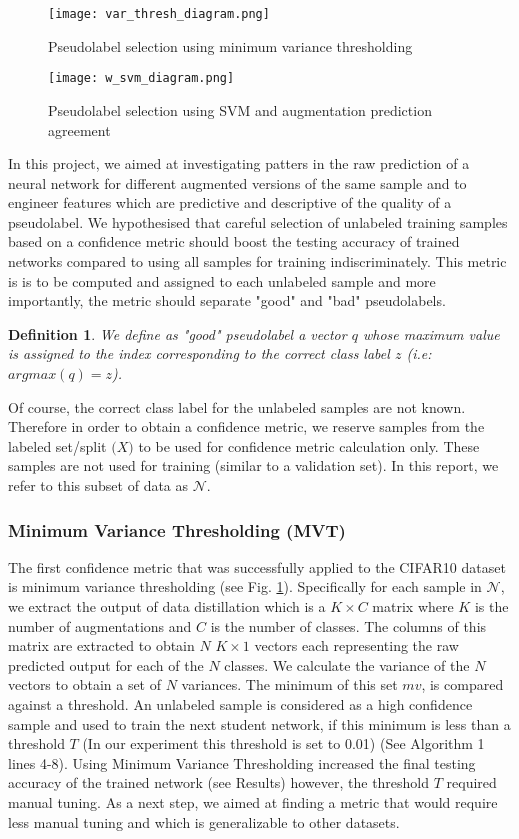 \documentclass{article}
\newtheorem{definition}{Definition}
\begin{document}
\begin{figure}[h]
\texttt{[image: var\_thresh\_diagram.png]}
\caption{Pseudolabel selection using minimum variance thresholding}
\label{min_var_diagram}
\end{figure}
\begin{figure}[h]
\texttt{[image: w\_svm\_diagram.png]}
\caption{Pseudolabel selection using SVM and augmentation prediction agreement}
\label{w_svm_diagram}
\end{figure}
In this project, we aimed at investigating patters in the raw prediction of a neural network for different augmented versions of the same sample and to engineer features which are predictive and descriptive of the quality of a pseudolabel. We hypothesised that careful selection of unlabeled training samples based on a confidence metric should boost the testing accuracy of trained networks compared to using all samples for training indiscriminately. This metric is is to be computed and assigned to each unlabeled sample and more importantly, the metric should separate "good" and "bad" pseudolabels. 
\theoremstyle{definition}
\begin{definition}{}
We define as "good" pseudolabel a vector $q$ whose maximum value is assigned to the index corresponding to the correct class label $z$ (i.e:  $argmax(q) = z$). 
\end{definition}

Of course, the correct class label for the unlabeled samples are not known. Therefore in order to obtain a confidence metric, we reserve samples from the labeled set/split $\mathcal(X)$ to be used for confidence metric calculation only. These samples are not used for training (similar to a validation set). In this report, we refer to this subset of data as $\mathcal{N}$. 
\subsubsection{Minimum Variance Thresholding (MVT)}
The first confidence metric that was successfully applied to the CIFAR10 dataset is minimum variance thresholding (see Fig. \ref{min_var_diagram}). Specifically for each sample in $\mathcal{N}$, we extract the output of data distillation  which is a $K\times C$ matrix where $K$ is the number of augmentations and $C$ is the number of classes. The columns of this matrix are extracted to obtain $N$ $K\times 1$ vectors each representing the raw predicted output for each of the $N$ classes. We calculate the variance of the $N$ vectors to obtain a set of $N$ variances. The minimum of this set $mv$, is compared against a threshold. An unlabeled sample is considered as a high confidence sample and used to train the next student network, if this minimum is less than a threshold $T$ (In our experiment this threshold is set to 0.01) (See Algorithm 1 lines 4-8). 
\newline 
Using Minimum Variance Thresholding increased the final testing accuracy of the trained network (see Results) however, the threshold $T$ required manual tuning. As a next step, we aimed at finding a metric that would require less manual tuning and which is generalizable to other datasets.
\end{document}
